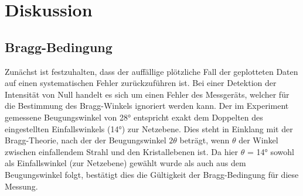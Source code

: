 \section{Diskussion}
\label{sec:Diskussion}

\subsection{Bragg-Bedingung}
Zunächst ist festzuhalten, dass der auffällige plötzliche Fall der geplotteten 
Daten auf einen systematischen Fehler zurückzuführen ist. Bei einer Detektion 
der Intensität von Null handelt es sich um einen Fehler des Messgeräts, welcher 
für die Bestimmung des Bragg-Winkels ignoriert werden kann. Der im Experiment
gemessene Beugungswinkel von 28° entspricht exakt dem Doppelten des eingestellten
Einfallswinkels (14°) zur Netzebene. Dies steht in Einklang mit der Bragg-Theorie,
nach der der Beugungswinkel $2 \theta$ beträgt, wenn $\theta$ der Winkel zwischen
einfallendem Strahl und den Kristallebenen ist. Da hier $\theta$ = 14° sowohl
als Einfallswinkel (zur Netzebene) gewählt wurde als auch aus dem Beugungswinkel 
folgt, bestätigt dies die Gültigkeit der Bragg-Bedingung für diese Messung.

